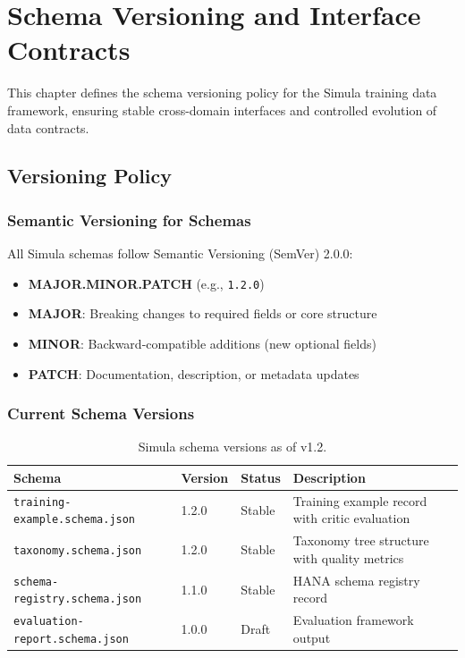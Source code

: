 \chapter{Schema Versioning and Interface Contracts}
\label{chap:schema-versioning}

This chapter defines the schema versioning policy for the Simula training data
framework, ensuring stable cross-domain interfaces and controlled evolution of
data contracts.

\section{Versioning Policy}

\subsection{Semantic Versioning for Schemas}

All Simula schemas follow Semantic Versioning (SemVer) 2.0.0:

\begin{itemize}
  \item \textbf{MAJOR.MINOR.PATCH} (e.g., \texttt{1.2.0})
  \item \textbf{MAJOR}: Breaking changes to required fields or core structure
  \item \textbf{MINOR}: Backward-compatible additions (new optional fields)
  \item \textbf{PATCH}: Documentation, description, or metadata updates
\end{itemize}

\subsection{Current Schema Versions}

\begin{table}[htbp]
\centering
\caption{Simula schema versions as of v1.2.}
\label{tab:schema-versions}
\footnotesize
\begin{tabularx}{\textwidth}{@{}l l l X@{}}
\toprule
\textbf{Schema} & \textbf{Version} & \textbf{Status} & \textbf{Description} \\
\midrule
\texttt{training-example.schema.json} & 1.2.0 & Stable & Training example record with critic evaluation \\
\texttt{taxonomy.schema.json} & 1.2.0 & Stable & Taxonomy tree structure with quality metrics \\
\texttt{schema-registry.schema.json} & 1.1.0 & Stable & HANA schema registry record \\
\texttt{evaluation-report.schema.json} & 1.0.0 & Draft & Evaluation framework output \\
\bottomrule
\end{tabularx}
\end{table}

